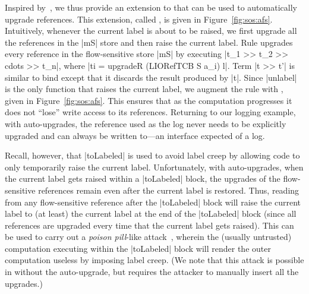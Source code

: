 Inspired by~\citep{Hedin13}, we thus provide an extension to \liofs{} that can
be used to automatically upgrade references.
%
This extension, called \lioafs{}, is given in Figure~\ref{fig:sos:afs}.
%
Intuitively, whenever the current label is about to be raised, we first upgrade
all the references in the |mS| store %
and then raise the current label.
%
Rule  upgrades every reference in the flow-sensitive store
|mS| by executing |t_1 >> t_2 >> cdots >> t_n|, where 
|ti = upgradeR (LIORefTCB S a_i) l|. Term |t >> t'| is
similar to bind except that it discards the result produced by
|t|.
%
Since |unlabel| is the only function that raises the current label, we
augment the  rule with , given in
Figure~\ref{fig:sos:afs}.
%
This ensures that as the computation progresses it does not ``lose''
write access to its references.
%
Returning to our logging example, with auto-upgrades, the reference used as the
log never needs to be explicitly upgraded and can always be written to---an
interface expected of a log.

Recall, however, that |toLabeled| is used to avoid label creep by
allowing code to only temporarily raise the current label.
%
Unfortunately, with auto-upgrades, when the current label gets raised 
within a |toLabeled| block, the upgrades of the flow-sensitive references remain even
after the current label is restored.
%
Thus, reading from any flow-sensitive reference after the |toLabeled|
block will raise the current label to (at least) the current label at the end
of the |toLabeled| block (since all references are upgraded every time that 
the current label gets raised).
%
This can be used to carry out a \emph{poison pill}-like
attack~\cite{Breeze}, wherein the (usually untrusted) computation
executing within the |toLabeled| block will render the outer computation useless
by imposing label creep.
%
(We note that this attack is possible in \liofs{} without the auto-upgrade, but
requires the attacker to manually insert all the upgrades.)

